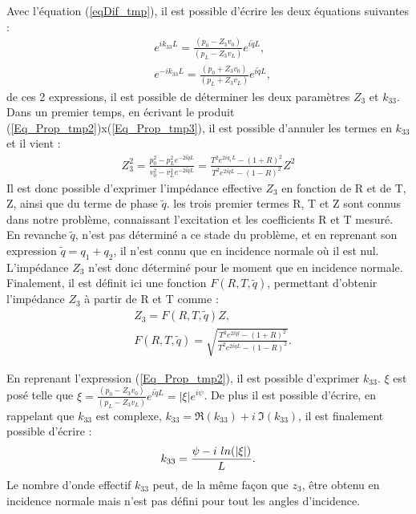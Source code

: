 \documentclass[12pt]{report}
\begin{document}
    Avec l'équation (\ref{eqDif_tmp}), il est possible d'écrire les deux équations suivantes :
    \begin{align}
        &e^{i k_{33}L}=\frac{(p_0-Z_3v_0)}{(p_L-Z_3v_L)}e^{i\tilde{q}L},\label{Eq_Prop_tmp2}\\
        &e^{-i k_{33}L}=\frac{(p_0+Z_3v_0)}{(p_L+Z_3v_L)}e^{i\tilde{q}L},\label{Eq_Prop_tmp3}
    \end{align}
    de ces 2 expressions, il est possible de déterminer les deux paramètres $Z_3$ et $k_{33}$.
    Dans un premier temps, en écrivant le produit (\ref{Eq_Prop_tmp2})x(\ref{Eq_Prop_tmp3}), il est possible d'annuler les termes en $k_{33}$ et il vient : 
    \begin{align}
    Z_3^2=\frac{p_0^2-p_L^2e^{-2i\tilde{q}L}}{v_0^2-v_L^2e^{-2i\tilde{q}L}}=\frac{T^2e^{2iq_1L}-(1+R)^2}{T^2e^{2i\tilde{q}L}-(1-R)^2}Z^2\label{Z3_tmp}
    \end{align}
    Il est donc possible d'exprimer l'impédance effective $Z_3$ en fonction de R et de T, Z, ainsi que du terme de phase $\tilde{q}$. les trois premier termes R, T et Z sont connus dans notre problème, connaissant l'excitation et les coefficients R et T mesuré. En revanche $\tilde{q}$, n'est pas déterminé a ce stade du problème, et en reprenant son expression $\tilde{q}=q_1+q_2$, il n'est connu que en incidence normale où il est nul. L'impédance $Z_3$ n'est donc déterminé pour le moment que en incidence normale. Finalement, il est définit ici une fonction $F(R,T,\tilde{q})$, permettant d'obtenir l'impédance $Z_3$ à partir de R et T comme :
    \begin{align}
    &Z_3=F(R,T,\tilde{q})Z,\label{Z3}\\
    &F(R,T,\tilde{q})=\sqrt{\frac{T^2e^{2i\tilde{q}l}-(1+R)^2}{T^2e^{2i\tilde{q}L}-(1-R)^2}}.\label{F(R,T,q)}
    \end{align}

    
    En reprenant l'expression (\ref{Eq_Prop_tmp2}), il est possible d'exprimer $k_{33}$. $\xi$ est posé telle que $\xi=\frac{(p_0-Z_3v_0)}{(p_L-Z_3v_L)}e^{i\tilde{q}L}=|\xi|e^{i\psi}$. De plus il est possible d'écrire, en rappelant que $k_{33}$ est complexe, $k_{33}=\Re(k_{33})+i\ \Im(k_{33})$, il est finalement possible d'écrire :
     \begin{align}
        k_{33}=\frac{\psi-i\ ln(|\xi|)}{L}\label{k_{33}}.
    \end{align}
    Le nombre d'onde effectif $k_{33}$ peut, de la même façon que $z_3$, être obtenu en incidence normale mais n'est pas défini pour tout les angles d'incidence.
    
\end{document}
